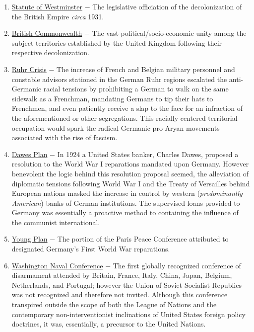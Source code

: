 \documentclass[12pt]{article}
\begin{document}
\begin{flushleft}
\begin{enumerate}
\item \underline{Statute of Westminster} $-$ The legislative officiation of the decolonization of the British Empire \emph{circa} 1931.

\item \underline{British Commonwealth} $-$ The vast political/socio-economic unity among the subject territories established by the United Kingdom following their respective decolonization. 

\item \underline{Ruhr Crisis} $-$ The increase of French and Belgian military personnel and constable advisors stationed in the German Ruhr regions escalated the anti-Germanic racial tensions by prohibiting a German to walk on the same sidewalk as a Frenchman, mandating Germans to tip their hats to Frenchmen, and even patiently receive a slap to the face for an infraction of the aforementioned or other segregations. This racially centered territorial occupation would spark the radical Germanic pro-Aryan movements associated with the rise of fascism.

\item \underline{Dawes Plan} $-$ In 1924 a United States banker, Charles Dawes, proposed a resolution to the World War I reparations mandated upon Germany. However benevolent the logic behind this resolution proposal seemed, the alleviation of diplomatic tensions following World War I and the Treaty of Versailles behind European nations masked the increase in control by western (\emph{predominantly American}) banks of German institutions. The supervised loans provided to Germany was essentially a proactive method to containing the influence of the communist international. 

\item \underline{Young Plan} $-$ The portion of the Paris Peace Conference attributed to designated Germany's First World War reparations.

\item \underline{Washington Naval Conference} $-$ The first globally recognized conference of disarmament attended by Britain, France, Italy, China, Japan, Belgium, Netherlands, and Portugal; however the Union of Soviet Socialist Republics was not recognized and therefore not invited. Although this conference transpired outside the scope of both the League of Nations and the contemporary non-interventionist inclinations of United States foreign policy doctrines, it was, essentially, a precursor to the United Nations. 


\end{enumerate}
\end{flushleft}
\end{document}

